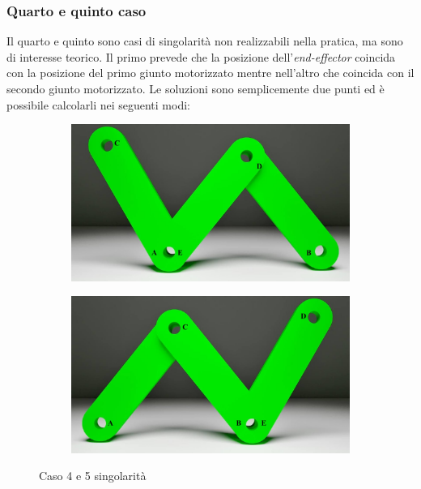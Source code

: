\subsubsection*{Quarto e quinto caso}
Il quarto e quinto sono casi di singolarità non realizzabili nella pratica, ma sono di interesse teorico. Il primo prevede che la posizione dell'\textit{end-effector} coincida con la posizione del primo giunto motorizzato mentre nell'altro che coincida con il secondo giunto motorizzato. Le soluzioni sono semplicemente due punti ed è possibile calcolarli nei seguenti modi:
\begin{figure}[!ht]
	\begin{subfigure}{.5\textwidth}
		\centering
		\includegraphics[width=.9\linewidth]{Immagini/Singolarity/3}
		\label{fig:sing4}
	\end{subfigure}
	\begin{subfigure}{.5\textwidth}
		\centering
		\includegraphics[width=.9\linewidth]{Immagini/Singolarity/4}  
		\label{fig:sing5}
	\end{subfigure}
	\caption{Caso 4 e 5 singolarità}
	\label{Caso4Sing}
\end{figure}
